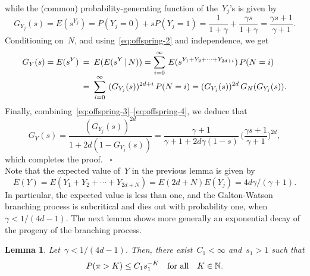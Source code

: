 \documentclass[letterpaper,11pt,twoside,keywordsasfootnote,addressatend,noinfoline]{article}
\newtheorem{lemma}[theorem]{Lemma}
\newenvironment{proof}{\noindent{\bf Proof.}}{\hspace*{2mm}~$\square$}
\newcommand{\N}{\mathbb{N}}
\newcommand{\n}{\hspace*{-5pt}}
\begin{document}
\begin{proof}
\begin{equation}
\end{equation}
 while the (common) probability-generating function of the~$Y_j$'s is given by
\begin{equation}
\label{eq:offspring-4}
  G_{Y_j} (s) = E (s^{Y_j}) = P (Y_j = 0) + s P (Y_j = 1) = \frac{1}{1 + \gamma} + \frac{\gamma s}{1 + \gamma} = \frac{\gamma s + 1}{\gamma + 1}.
\end{equation}
 Conditioning on~$N$, and using~\eqref{eq:offspring-2} and independence, we get
 $$ \begin{array}{rcl}
    \displaystyle G_Y (s) = E (s^Y) & \n = \n &
    \displaystyle E (E (s^Y \,| \,N)) = \sum_{i = 0}^{\infty} \,E (s^{Y_1 + Y_2 + \cdots + Y_{2d + i}}) \,P (N = i) \vspace*{0pt} \\ & \n = \n &
    \displaystyle \sum_{i = 0}^{\infty} \ (G_{Y_j} (s))^{2d + i} \,P (N = i) = (G_{Y_j} (s))^{2d} \,G_N (G_{Y_j} (s)). \end{array} $$
 Finally, combining~\eqref{eq:offspring-3}--\eqref{eq:offspring-4}, we deduce that
 $$ G_Y (s) = \frac{(G_{Y_j} (s))^{2d}}{1 + 2d (1 - G_{Y_j} (s))} = \frac{\gamma + 1}{\gamma + 1 + 2d \gamma (1 - s)} \,\bigg(\frac{\gamma s + 1}{\gamma + 1} \bigg)^{2d}, $$
 which completes the proof.
\end{proof} \vspace*{8pt} \\
 Note that the expected value of~$Y$ in the previous lemma is given by
 $$ E (Y) = E (Y_1 + Y_2 + \cdots + Y_{2d + N}) = E (2d + N) E (Y_j) = 4d \gamma / (\gamma + 1). $$
 In particular, the expected value is less than one, and the Galton-Watson branching process is subcritical and dies out with probability one, when~$\gamma < 1 / (4d - 1)$.
 The next lemma shows more generally an exponential decay of the progeny of the branching process.
\begin{lemma}
\label{lem:progeny}
 Let~$\gamma < 1 / (4d - 1)$.
 Then, there exist~$C_1 < \infty$ and~$s_1 > 1$ such that
 $$ P (\pi > K) \leq C_1 s_1^{-K} \quad \hbox{for all} \quad K \in \N. $$
\end{lemma}
\end{document}
